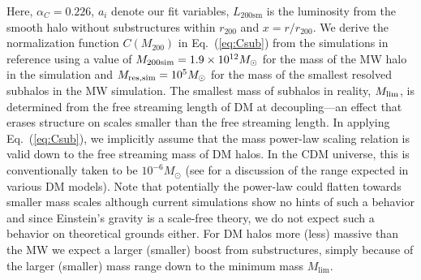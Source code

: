 \documentclass[10pt,aps,pra,reprint,amsmath,amsfonts,amssymb,showpacs,nofootinbib,floatfix]{revtex4-1}
\newcommand{\rmn}{\mathrm}
\newcommand{\msun}{M_\odot}
\newcommand{\sm}{\rmn{sm}}
\newcommand{\rvir}{r_{200}}
\newcommand{\mvir}{M_{200}}
\begin{document}
Here, $\alpha_C=0.226$, $a_i$ denote our fit variables, $L_{200\sm}$
is the luminosity from the smooth halo without substructures within
$\rvir$ and $x= r/\rvir$.  We derive the normalization function
$C(\mvir)$ in Eq.~(\ref{eq:Csub}) from the simulations in reference
\cite{2008Natur.456...73S} using a value of $M_{\rm
  200sim}=1.9\times10^{12}\msun$ for the mass of the MW halo in the
simulation and $M_{\rm res,sim}=10^5\msun$ for the mass of the
smallest resolved subhalos in the MW simulation.  The smallest mass of
subhalos in reality, $M_{\rm lim}$, is determined from the free
streaming length of DM at decoupling---an effect that erases structure
on scales smaller than the free streaming length. In applying
Eq.~(\ref{eq:Csub}), we implicitly assume that the mass power-law
scaling relation is valid down to the free streaming mass of DM
halos. In the CDM universe, this is conventionally taken to be
$10^{-6}\msun$ \cite{2001PhRvD..64h3507H, 2005JCAP...08..003G} (see
\cite{2009NJPh...11j5027B} for a discussion of the range expected in
various DM models). Note that potentially the power-law could flatten
towards smaller mass scales although current simulations show no hints
of such a behavior and since Einstein's gravity is a scale-free
theory, we do not expect such a behavior on theoretical grounds
either.  For DM halos more (less) massive than the MW we expect a
larger (smaller) boost from substructures, simply because of the
larger (smaller) mass range down to the minimum mass $M_\rmn{lim}$.
\end{document}

